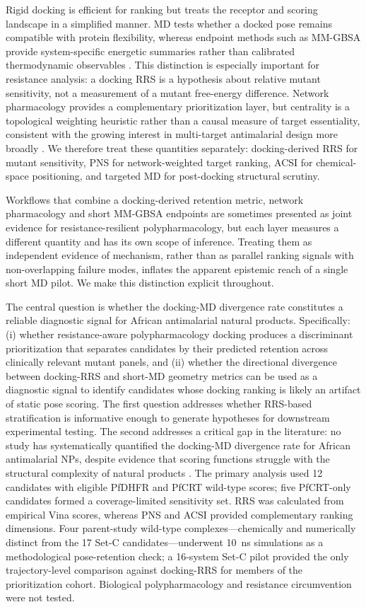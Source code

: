 \documentclass[journal=jcisd8,manuscript=article,layout=traditional]{achemso}
\begin{document}
Rigid docking is efficient for ranking but treats the receptor and scoring landscape in a simplified manner. MD tests whether a docked pose remains compatible with protein flexibility, whereas endpoint methods such as MM-GBSA provide system-specific energetic summaries rather than calibrated thermodynamic observables \citep{gmx_mmpbsa_2021,wang2019_mmgbsa}. This distinction is especially important for resistance analysis: a docking RRS is a hypothesis about relative mutant sensitivity, not a measurement of a mutant free-energy difference. Network pharmacology provides a complementary prioritization layer, but centrality is a topological weighting heuristic rather than a causal measure of target essentiality, consistent with the growing interest in multi-target antimalarial design more broadly \citep{multi_target_antimalarials_2025}. We therefore treat these quantities separately: docking-derived RRS for mutant sensitivity, PNS for network-weighted target ranking, ACSI for chemical-space positioning, and targeted MD for post-docking structural scrutiny.

Workflows that combine a docking-derived retention metric, network pharmacology and short MM-GBSA endpoints are sometimes presented as joint evidence for resistance-resilient polypharmacology, but each layer measures a different quantity and has its own scope of inference. Treating them as independent evidence of mechanism, rather than as parallel ranking signals with non-overlapping failure modes, inflates the apparent epistemic reach of a single short MD pilot. We make this distinction explicit throughout.

The central question is whether the docking-MD divergence rate constitutes a reliable diagnostic signal for African antimalarial natural products. Specifically: (i) whether resistance-aware polypharmacology docking produces a discriminant prioritization that separates candidates by their predicted retention across clinically relevant mutant panels, and (ii) whether the directional divergence between docking-RRS and short-MD geometry metrics can be used as a diagnostic signal to identify candidates whose docking ranking is likely an artifact of static pose scoring. The first question addresses whether RRS-based stratification is informative enough to generate hypotheses for downstream experimental testing. The second addresses a critical gap in the literature: no study has systematically quantified the docking-MD divergence rate for African antimalarial NPs, despite evidence that scoring functions struggle with the structural complexity of natural products \citep{ramirez2018docking,ancajas2024np_sar}. The primary analysis used \num{12} candidates with eligible PfDHFR and PfCRT wild-type scores; five PfCRT-only candidates formed a coverage-limited sensitivity set. RRS was calculated from empirical Vina scores, whereas PNS and ACSI provided complementary ranking dimensions. Four parent-study wild-type complexes---chemically and numerically distinct from the 17 Set-C candidates---underwent \qty{10}{\nano\second} simulations as a methodological pose-retention check; a 16-system Set-C pilot provided the only trajectory-level comparison against docking-RRS for members of the prioritization cohort. Biological polypharmacology and resistance circumvention were not tested.
\end{document}
